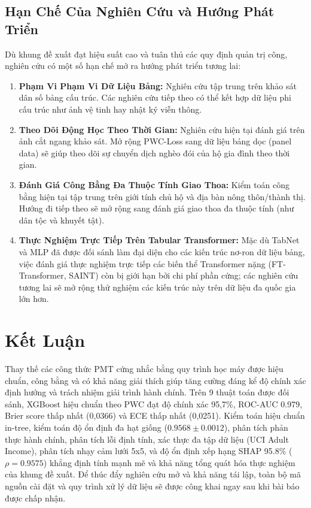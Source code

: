 \documentclass[conference]{IEEEtran}
\begin{document}
\subsection{Hạn Chế Của Nghiên Cứu và Hướng Phát Triển}
Dù khung đề xuất đạt hiệu suất cao và tuân thủ các quy định quản trị công, nghiên cứu có một số hạn chế mở ra hướng phát triển tương lai:
\begin{enumerate}
\item \textbf{Phạm Vi Phạm Vi Dữ Liệu Bảng:} Nghiên cứu tập trung trên khảo sát dân số bảng cấu trúc. Các nghiên cứu tiếp theo có thể kết hợp dữ liệu phi cấu trúc như ảnh vệ tinh hay nhật ký viễn thông.
\item \textbf{Theo Dõi Động Học Theo Thời Gian:} Nghiên cứu hiện tại đánh giá trên ảnh cắt ngang khảo sát. Mở rộng PWC-Loss sang dữ liệu bảng dọc (panel data) sẽ giúp theo dõi sự chuyển dịch nghèo đói của hộ gia đình theo thời gian.
\item \textbf{Đánh Giá Công Bằng Đa Thuộc Tính Giao Thoa:} Kiểm toán công bằng hiện tại tập trung trên giới tính chủ hộ và địa bàn nông thôn/thành thị. Hướng đi tiếp theo sẽ mở rộng sang đánh giá giao thoa đa thuộc tính (như dân tộc và khuyết tật).
\item \textbf{Thực Nghiệm Trực Tiếp Trên Tabular Transformer:} Mặc dù TabNet và MLP đã được đối sánh làm đại diện cho các kiến trúc nơ-ron dữ liệu bảng, việc đánh giá thực nghiệm trực tiếp các biến thể Transformer nặng (FT-Transformer, SAINT) còn bị giới hạn bởi chi phí phần cứng; các nghiên cứu tương lai sẽ mở rộng thử nghiệm các kiến trúc này trên dữ liệu đa quốc gia lớn hơn.
\end{enumerate}


\section{Kết Luận}

Thay thế các công thức PMT cứng nhắc bằng quy trình học máy được hiệu chuẩn, công bằng và có khả năng giải thích giúp tăng cường đáng kể độ chính xác định hướng và trách nhiệm giải trình hành chính. Trên 9 thuật toán được đối sánh, XGBoost hiệu chuẩn theo PWC đạt độ chính xác 95,7\%, ROC-AUC 0.979, Brier score thấp nhất (0,0366) và ECE thấp nhất (0,0251). Kiểm toán hiệu chuẩn in-tree, kiểm toán độ ổn định đa hạt giống ($0.9568 \pm 0.0012$), phân tích phản thực hành chính, phân tích lỗi định tính, xác thực đa tập dữ liệu (UCI Adult Income), phân tích nhạy cảm lưới 5x5, và độ ổn định xếp hạng SHAP 95.8\% ($\rho = 0.9575$) khẳng định tính mạnh mẽ và khả năng tổng quát hóa thực nghiệm của khung đề xuất. Để thúc đẩy nghiên cứu mở và khả năng tái lập, toàn bộ mã nguồn cài đặt và quy trình xử lý dữ liệu sẽ được công khai ngay sau khi bài báo được chấp nhận.
\end{document}
